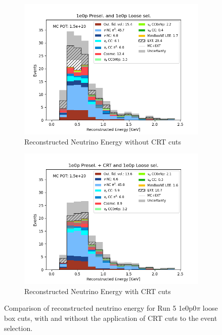 \begin{figure}[H] \centering
    \begin{subfigure}[t]{0.45\linewidth}
        \includegraphics[width=\linewidth]{technote/EventSelections/FiguresCRT/0Ploose.png}
        \caption{Reconstructed Neutrino Energy without CRT cuts}
    \end{subfigure}%
    \hspace{0.45cm}%
    \begin{subfigure}[t]{0.45\linewidth}
        \includegraphics[width=\linewidth]{technote/EventSelections/FiguresCRT/0PlooseCRT.png}%
        \caption{Reconstructed Neutrino Energy with CRT cuts}
    \end{subfigure}%
    \caption{Comparison of reconstructed neutrino energy for Run 5 1e0p0$\pi$ loose box cuts, with and without the application of CRT cuts to the event selection.}
    \label{fig:1e0p_loosecuts}
\end{figure}

